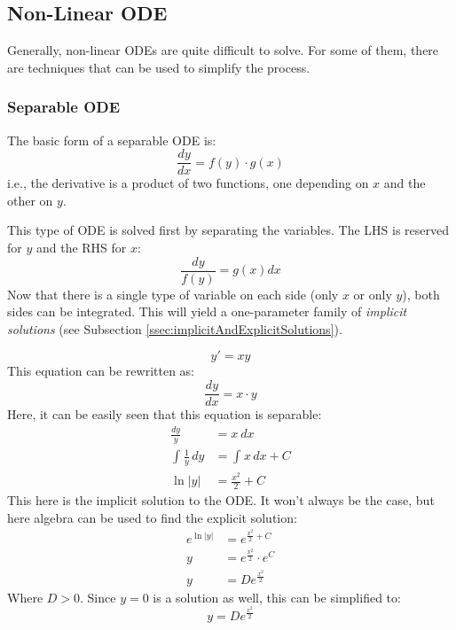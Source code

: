 \documentclass[12pt]{article}
\begin{document}
\subsection{Non-Linear ODE}
\label{ssec:nonLinearODE}

Generally, non-linear ODEs are quite difficult to solve. For some of them, there are techniques that can be used to simplify the process.

\subsubsection{Separable ODE}
\label{sssec:separableODE}

The basic form of a separable ODE is:
\begin{equation*}
  \frac{dy}{dx} = f(y) \cdot g(x)
\end{equation*}
i.e., the derivative is a product of two functions, one depending on $x$ and the other on $y$.

This type of ODE is solved first by separating the variables. The LHS is reserved for $y$ and the RHS for $x$:
\begin{equation*}
  \frac{dy}{f(y)} = g(x) dx
\end{equation*}
Now that there is a single type of variable on each side (only $x$ or only $y$), both sides can be integrated. This will yield a one-parameter family of \textit{implicit solutions} (see Subsection \ref{ssec:implicitAndExplicitSolutions}).
\begin{example}
  \begin{equation*}
    y' = xy
  \end{equation*}
  This equation can be rewritten as:
  \begin{equation*}
    \frac{dy}{dx} = x \cdot y
  \end{equation*}
  Here, it can be easily seen that this equation is separable:
  \begin{align*}
    \frac{dy}{y} &= x\ dx \\
    \int_{}^{} \frac{1}{y} \, dy &= \int_{}^{} x \, dx + C \\
    \ln|y| &= \frac{x^2}{2} + C
  \end{align*}
  This here is the implicit solution to the ODE. It won't always be the case, but here algebra can be used to find the explicit solution:
  \begin{align*}
    e^{\ln|y|} &= e^{\frac{x^2}{2} + C} \\
    y &= e^{\frac{x^2}{2}} \cdot e^{C} \\
    y &= De^{\frac{x^2}{2}}
  \end{align*}
  Where $D>0$. Since $y=0$ is a solution as well, this can be simplified to:
  \begin{equation*}
    y = De^{\frac{x^2}{2}}
  \end{equation*}
\end{example}
\end{document}

